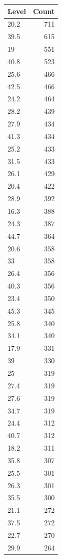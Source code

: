 \begin{table}[ht]
\centering
\begin{tabular}{lr}
  \hline
Level & Count \\ 
  \hline
20.2 & 711 \\ 
  39.5 & 615 \\ 
  19 & 551 \\ 
  40.8 & 523 \\ 
  25.6 & 466 \\ 
  42.5 & 466 \\ 
  24.2 & 464 \\ 
  28.2 & 439 \\ 
  27.9 & 434 \\ 
  41.3 & 434 \\ 
  25.2 & 433 \\ 
  31.5 & 433 \\ 
  26.1 & 429 \\ 
  20.4 & 422 \\ 
  28.9 & 392 \\ 
  16.3 & 388 \\ 
  24.3 & 387 \\ 
  44.7 & 364 \\ 
  20.6 & 358 \\ 
  33 & 358 \\ 
  26.4 & 356 \\ 
  40.3 & 356 \\ 
  23.4 & 350 \\ 
  45.3 & 345 \\ 
  25.8 & 340 \\ 
  34.1 & 340 \\ 
  17.9 & 331 \\ 
  39 & 330 \\ 
  25 & 319 \\ 
  27.4 & 319 \\ 
  27.6 & 319 \\ 
  34.7 & 319 \\ 
  24.4 & 312 \\ 
  40.7 & 312 \\ 
  18.2 & 311 \\ 
  35.8 & 307 \\ 
  25.5 & 301 \\ 
  26.3 & 301 \\ 
  35.5 & 300 \\ 
  21.1 & 272 \\ 
  37.5 & 272 \\ 
  22.7 & 270 \\ 
  29.9 & 264 \\ 

\end{tabular}
\end{table}
